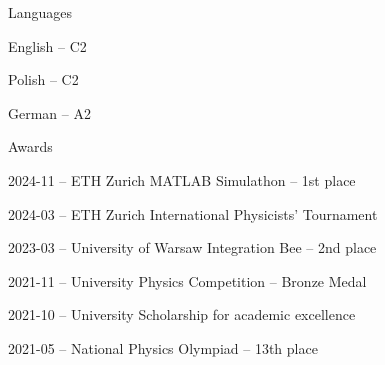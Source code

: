 \documentclass{./cv}
\begin{document}
\begin{cvsection}{Languages}
    \begin{languages}
        \item English -- C2
        \item Polish -- C2
        \item German -- A2
    \end{languages}
\end{cvsection}
\begin{cvsection}{Awards}
    \begin{awards}
        \item[2024-11 --] ETH Zurich MATLAB Simulathon -- 1st place
        \item[2024-03 --] ETH Zurich International Physicists’ Tournament
        \item[2023-03 --] University of Warsaw Integration Bee -- 2nd place
        \item[2021-11 --] University Physics Competition -- Bronze Medal
        \item[2021-10 --] University Scholarship for academic excellence
        \item[2021-05 --] National Physics Olympiad -- 13th place
    \end{awards}
\end{cvsection}
\end{document}
